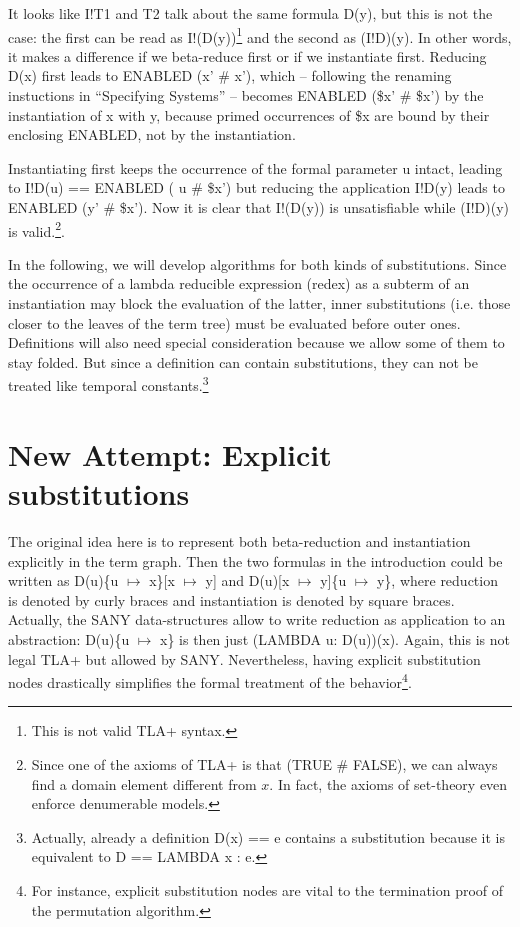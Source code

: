 \documentclass[a4paper]{article}
\newcommand{\tlaplus}[0]{{TLA+}}
\newcommand{\tla}[1]{#1}
\begin{document}
\vspace{2mm}
\noindent
It looks like \tla{I!T1} and \tla{T2} talk about the same formula \tla{D(y)},
but this is not the case: the first can be read as \tla{I!(D(y))}\footnote{This
  is not valid \tlaplus{} syntax.} and the second as \tla{(I!D)(y)}. In other
words, it makes a difference if we beta-reduce first or if we instantiate
first. Reducing D(x) first leads to \tla{ENABLED (x' \# x')}, which --
following the renaming instuctions in ``Specifying Systems'' -- becomes
\tla{ENABLED (\$x' \# \$x')} by the instantiation of \tla{x} with \tla{y},
because primed occurrences of \tla{\$x} are bound by their enclosing ENABLED,
not by the instantiation.

Instantiating first keeps the occurrence of the  formal parameter \tla{u} intact,
leading to \tla{I!D(u) == ENABLED ( u \# \$x') } but reducing the application
\tla{I!D(y)} leads to \tla{ENABLED (y' \# \$x')}. Now it is clear that
\tla{I!(D(y))} is unsatisfiable while \tla{(I!D)(y)} is valid.\footnote{ Since
  one of the axioms  of \tlaplus{} is that (TRUE \# FALSE), we can always find
  a domain element different from $x$. In fact, the axioms of set-theory even
  enforce denumerable models.}.

In the following, we will develop algorithms for both kinds of substitutions.
Since the occurrence of a lambda reducible expression (redex) as a subterm of
an instantiation may block the evaluation of the latter, inner substitutions
(i.e. those closer to the leaves of the term tree) must be evaluated before
outer ones. Definitions will also need special consideration because
we allow some of them to stay folded. But since a definition can contain
substitutions, they can not be treated like temporal constants.\footnote{
  Actually, already a definition \tla{D(x) == e} contains a substitution
  because it is equivalent to D == LAMBDA x : e.
}

\section{New Attempt: Explicit substitutions}

The original idea here is to represent both beta-reduction and instantiation
explicitly in the term graph. Then the two formulas in the introduction
could be written as D(u)\{u $\mapsto$ x\}[x $\mapsto$ y] and
D(u)[x $\mapsto$ y]\{u $\mapsto$ y\}, where reduction is denoted by curly
braces and instantiation is denoted by square braces. Actually, the SANY
data-structures allow to write reduction as application to an abstraction:
D(u)\{u $\mapsto$ x\} is then just \tla{(LAMBDA u: D(u))(x)}. Again, this
is not legal \tlaplus{} but allowed by SANY. Nevertheless, having explicit
substitution nodes drastically simplifies the formal treatment of the
behavior\footnote{For instance, explicit substitution nodes are vital to the
  termination proof of the permutation algorithm.
}.
\end{document}
